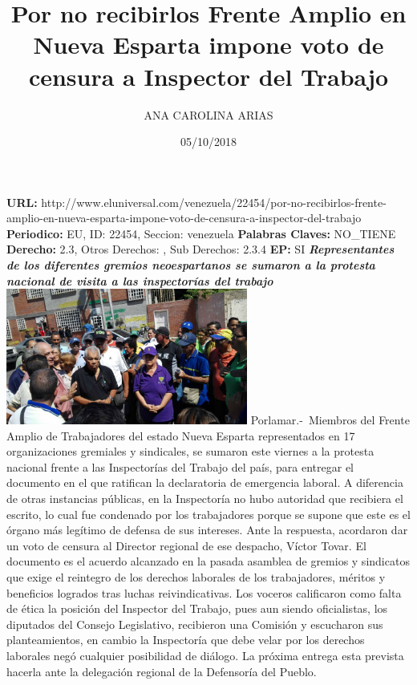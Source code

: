 \documentclass{article}%
\title{\textbf{Por no recibirlos Frente Amplio en Nueva Esparta impone voto de censura a Inspector del Trabajo}}%
\author{ANA CAROLINA ARIAS}%
\date{05/10/2018}%
\begin{document}
%
\normalsize%
\maketitle%
\textbf{URL: }%
http://www.eluniversal.com/venezuela/22454/por{-}no{-}recibirlos{-}frente{-}amplio{-}en{-}nueva{-}esparta{-}impone{-}voto{-}de{-}censura{-}a{-}inspector{-}del{-}trabajo\newline%
%
\textbf{Periodico: }%
EU, %
ID: %
22454, %
Seccion: %
venezuela\newline%
%
\textbf{Palabras Claves: }%
NO\_TIENE\newline%
%
\textbf{Derecho: }%
2.3, %
Otros Derechos: %
, %
Sub Derechos: %
2.3.4\newline%
%
\textbf{EP: }%
SI\newline%
\newline%
%
\textbf{\textit{Representantes de los diferentes gremios neoespartanos se sumaron a la protesta nacional de visita a las inspectorías del trabajo}}%
\newline%
\newline%
%
\includegraphics[width=300px]{91.jpg}%
\newline%
%
Porlamar.{-}~Miembros del Frente Amplio de Trabajadores del estado Nueva Esparta representados en 17 organizaciones gremiales y sindicales, se sumaron este viernes a la protesta nacional frente a las Inspectorías del Trabajo del país, para entregar el documento en el que ratifican la declaratoria de emergencia laboral.%
\newline%
%
A diferencia de otras instancias públicas, en la Inspectoría no hubo autoridad que recibiera el escrito, lo cual fue condenado por los trabajadores porque se supone que este es el órgano  más legítimo de defensa de sus intereses.%
\newline%
%
Ante la respuesta, acordaron dar un voto de censura al Director regional de ese despacho, Víctor Tovar.%
\newline%
%
El documento es el acuerdo alcanzado en la pasada asamblea de gremios y sindicatos que exige el reintegro de los derechos laborales de los trabajadores, méritos y beneficios logrados tras luchas reivindicativas.%
\newline%
%
Los voceros calificaron como falta de ética la posición del Inspector del Trabajo, pues aun siendo oficialistas, los diputados del Consejo Legislativo, recibieron una Comisión y escucharon sus planteamientos, en cambio la Inspectoría que debe velar por los derechos laborales negó cualquier posibilidad de diálogo.%
\newline%
%
La próxima entrega esta prevista hacerla ante la delegación regional de la Defensoría del Pueblo.%
\newline%
%
\end{document}

